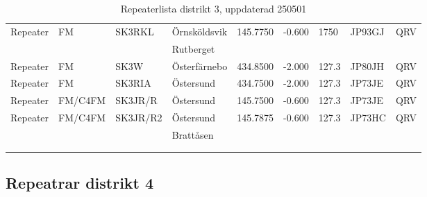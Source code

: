 \begin{longtable}{llllrrlll}
Repeater   & FM         & SK3RKL   & Örnsköldsvik     & 145.7750    & -0.600   & 1750       & JP93GJ & QRV  \\
           &            &          & Rutberget        &             &          &            &        &      \\
Repeater   & FM         & SK3W     & Österfärnebo     & 434.8500    & -2.000   & 127.3      & JP80JH & QRV  \\
Repeater   & FM         & SK3RIA   & Östersund        & 434.7500    & -2.000   & 127.3      & JP73JE & QRV  \\
Repeater   & FM/C4FM    & SK3JR/R  & Östersund        & 145.7500    & -0.600   & 127.3      & JP73JE & QRV  \\
Repeater   & FM/C4FM    & SK3JR/R2 & Östersund        & 145.7875    & -0.600   & 127.3      & JP73HC & QRV  \\
           &            &          & Brattåsen        &             &          &            &        &      \\
\vspace{1 ex}                                                                                               \\
\caption{Repeaterlista distrikt 3, uppdaterad 250501}                                                       \\
\end{longtable}

\clearpage

\subsection{Repeatrar distrikt 4}

